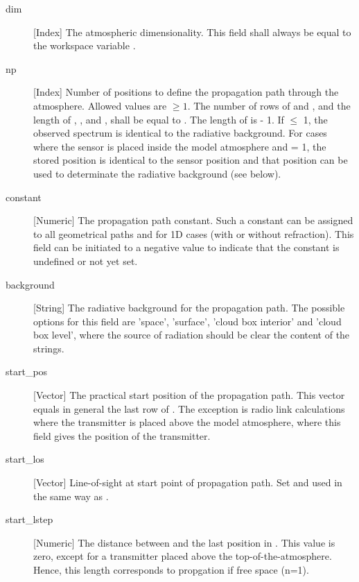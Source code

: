 \begin{description}

  \item[dim] [Index] The atmospheric dimensionality. This field shall always 
     be equal to the workspace variable .
     
   \item[np] [Index] Number of positions to define the propagation path through
     the atmosphere. Allowed values are $\geq 1$. The number of rows of
      and , and the length of ,
     ,  and , shall be
     equal to . The length of  is
      - 1. If  $\leq$ 1, the observed spectrum is
     identical to the radiative background. For cases where the sensor is
     placed inside the model atmosphere and  = 1, the stored
     position is identical to the sensor position and that position can be used
     to determinate the radiative background (see below).

   \item[constant] [Numeric] The propagation path constant. Such a
     constant can be assigned to all geometrical paths and for 1D
     cases (with or without refraction). This field can be
     initiated to a negative value to indicate that the constant is
     undefined or not yet set. 

   \item[background] [String] The radiative background for the propagation
     path. The possible options for this field are 'space', 'surface', 'cloud
     box interior' and 'cloud box level', where the source of radiation
     should be clear the content of the strings.
     
   \item[start\_pos] [Vector] The practical start position of the propagation
     path. This vector equals in general the last row of . The
     exception is radio link calculations where the transmitter is placed above
     the model atmosphere, where this field gives the position of the
     transmitter.

   \item[start\_los] [Vector] Line-of-sight at start point of propagation
     path. Set and used in the same way as .

   \item[start\_lstep] [Numeric] The distance between 
     and the last position in . This value is zero, except for a
     transmitter placed above the top-of-the-atmosphere. Hence, this length
     corresponds to propgation if free space (n=1).


\end{description}
